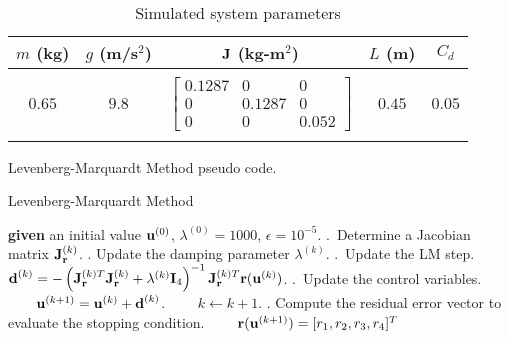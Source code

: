 

\begin{table}[ht]
    \centering
    \caption{Simulated system parameters}
    \begin{tabular}{ccccc}
        \toprule
        $m$ (kg) & $g$ (m/s${}^2$) & $\bm{\mathrm{J}}$ (kg-m${}^2$) & $L$ (m) & $C_d$ \\
        \midrule
        & \\
        $0.65$ & $9.8$ & $\begin{bmatrix}
        0.1287 & 0 & 0 \\
        0 & 0.1287 & 0 \\
        0 & 0 & 0.052
        \end{bmatrix}$ & $0.45$ & $0.05$ \\ & \\
        \bottomrule
    \end{tabular}
    \label{tab:Sim_Para}
\end{table}

\begin{table}[H]
    \setlength{\abovecaptionskip}{0cm}
    \caption{Levenberg-Marquardt Method pseudo code.}
        \begin{minipage}{\linewidth}
            \begin{algorithm}[H]
                \caption{Levenberg-Marquardt Method}\label{alg:LM}
                \begin{algorithmic}
                    \State \textbf{given} an initial value $\bm{\mathrm{u}}^{(0)}$, $\lambda^{(0)} = 1000$, $\epsilon = 10^{-5}$.
                    \Repeat
                    .~Determine a Jacobian matrix $\bm{\mathrm{J}}_{\bm{\mathrm{r}}}^{(k)}$.
                    . Update the damping parameter $\lambda^{(k)}$.
                    .~Update the LM step. 
                    \State ~~~~$\bm{\mathrm{d}}^{(k)} = -\left({\bm{\mathrm{J}}_{\bm{\mathrm{r}}}^{(k)T}} \bm{\mathrm{J}}_{\bm{\mathrm{r}}}^{(k)} +\lambda^{(k)} {\bm{\mathrm{I}}_4} \right)^{-1} \bm{\mathrm{J}}_{\bm{\mathrm{r}}}^{(k)T} \bm{\mathrm{r}}(\bm{\mathrm{u}}^{(k)})$.
                    .~Update the control variables.
                    \State ~~~~$\bm{\mathrm{u}}^{(k+1)} = \bm{\mathrm{u}}^{(k)} +\bm{\mathrm{d}}^{(k)}$.
                    \State ~~~~$k \leftarrow k+1$.
                    . Compute the residual error vector to evaluate the stopping condition.
                    \State ~~~~$\bm{\mathrm{r}}(\bm{\mathrm{u}}^{(k+1)}) = [r_1, r_2, r_3, r_4]^T$ 
                \end{algorithmic}
            \end{algorithm}
        \end{minipage}
    \end{table}